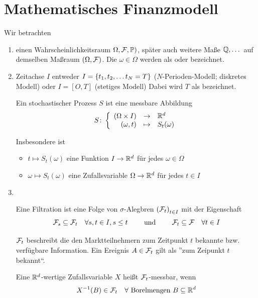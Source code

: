 \section{Mathematisches Finanzmodell}

Wir betrachten
\begin{enumerate}[leftmargin=*]
	\item einen Wahrscheinlichkeitsraum $\Omega, \mathcal{F}, \mathbb{P})$, später auch weitere Maße $\mathbb{Q}, \dots$ auf demselben Maßraum $(\Omega, \mathcal{F})$. Die $\omega \in \Omega$ werden als  oder  bezeichnet.
	\item Zeitachse $I$ entweder $I = \left\{ t_1, t_2, \dots t_N = T \right\}$ ($N$-Perioden-Modell; diskretes Modell) oder $I = [O,T]$ (stetiges Modell)
	Dabei wird $T$ als  bezeichnet.
	\begin{definition}
		Ein stochastischer Prozess $S$ ist eine messbare Abbildung 
		\begin{equation*}
		S \colon \left\lbrace \begin{array}{rcl} (\Omega \times I) & \to & \mathbb{R}^d \\(\omega, t) & \mapsto & S_t(\omega) \end{array} \right.
		\end{equation*}
	\end{definition}
	Insbesondere ist 
	\begin{itemize}[nolistsep, topsep=-\parskip]
		\item $t \mapsto S_t(\omega)$ eine Funktion $I \to \mathbb{R}^d$ für jedes $\omega \in \Omega$ 
		\item $\omega \mapsto S_t(\omega)$ eine Zufallsvariable $\Omega \to \mathbb{R}^d$ für jedes $t \in I$
	\end{itemize}
	\item ~\vspace{-2em}
	 \begin{definition}[Filtration]
	 	Eine Filtration ist eine Folge von $\sigma$-Alegbren $\left( \mathcal{F}_t \right)_{t \in I}$ mit der Eigenschaft
	 	\begin{equation*}
	 	\mathcal{F}_s \subseteq \mathcal{F}_t \quad \forall s,t \in I, s \le t \qquad \text{ und } \qquad \mathcal{F}_t \subseteq \mathcal{F} \quad \forall t \in I
	 	\end{equation*}
	 \end{definition}
 	\begin{*interpretation}
 		$\mathcal{F}_t$ beschreibt die den Marktteilnehmern zum Zeitpunkt $t$ bekannte bzw. verfügbare Information. Ein Ereignis $A \in \mathcal{F}_t$ gilt als ''zum Zeipunkt $t$ bekannt``.
 	\end{*interpretation}
	
	\begin{*erinnerung_inline}
		Eine $\mathbb{R}^d$-wertige Zufallsvariable $X$ heißt $\mathcal{F}_t$-messbar, wenn
		\begin{equation*}
		X^{-1}(B) \in \mathcal{F}_t \quad \forall \text{ Borelmengen } B \subseteq \mathbb{R}^d
		\end{equation*}
	\end{*erinnerung_inline}


\end{enumerate}
